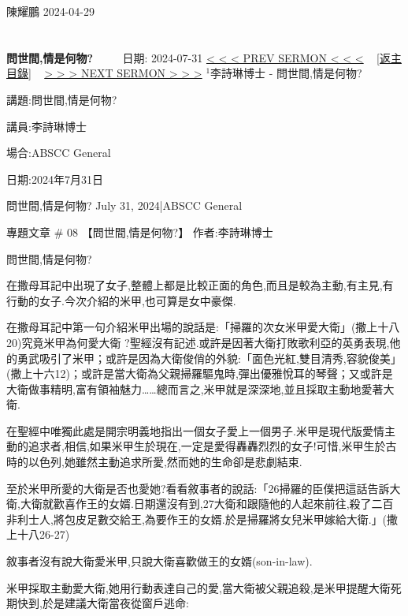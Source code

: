 \documentclass{book}
\begin{document}
陳耀鵬
2024-04-29
\newpage



\section{}
\label{sec:14}
\textbf{問世間,情是何物?}
\newline
\newline
~~~~ 日期: 2024-07-31
\newline
\newline
\hyperref[sec:13]{\small{< < < PREV SERMON < < <}}
~
\hyperref[sec:index]{\small{[返主目錄]}}
~
\hyperref[sec:15]{\small{> > > NEXT SERMON > > >}}
\newline
\newline
$^{1}$李詩琳博士 - 問世間,情是何物?

講題:問世間,情是何物?

講員:李詩琳博士

場合:ABSCC General

日期:2024年7月31日

問世間,情是何物?
July 31, 2024|ABSCC General

專題文章 \# 08
【問世間,情是何物?】
作者:李詩琳博士

問世間,情是何物?

在撒母耳記中出現了女子,整體上都是比較正面的角色,而且是較為主動,有主見,有行動的女子.今次介紹的米甲,也可算是女中豪傑.

在撒母耳記中第一句介紹米甲出場的說話是:「掃羅的次女米甲愛大衛」(撒上十八20)究竟米甲為何愛大衛 ?聖經沒有記述.或許是因著大衛打敗歌利亞的英勇表現,他的勇武吸引了米甲；或許是因為大衛俊俏的外貌:「面色光紅,雙目清秀,容貌俊美」(撒上十六12)；或許是當大衛為父親掃羅驅鬼時,彈出優雅悅耳的琴聲；又或許是大衛做事精明,富有領袖魅力……總而言之,米甲就是深深地,並且採取主動地愛著大衛.

在聖經中唯獨此處是開宗明義地指出一個女子愛上一個男子.米甲是現代版愛情主動的追求者,相信,如果米甲生於現在,一定是愛得轟轟烈烈的女子!可惜,米甲生於古時的以色列,她雖然主動追求所愛,然而她的生命卻是悲劇結束.

至於米甲所愛的大衛是否也愛她?看看敘事者的說話:「26掃羅的臣僕把這話告訴大衛,大衛就歡喜作王的女婿.日期還沒有到,27大衛和跟隨他的人起來前往,殺了二百非利士人,將包皮足數交給王,為要作王的女婿.於是掃羅將女兒米甲嫁給大衛.」(撒上十八26-27)

敘事者沒有說大衛愛米甲,只說大衛喜歡做王的女婿(son-in-law).

米甲採取主動愛大衛,她用行動表達自己的愛,當大衛被父親追殺,是米甲提醒大衛死期快到,於是建議大衛當夜從窗戶逃命:
\end{document}
